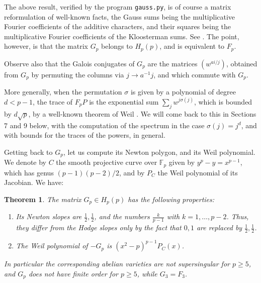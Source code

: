 \documentclass[11pt]{amsart}
\newtheorem{theorem}{Theorem}[section]
\theoremstyle{definition}
\begin{document}
The above result, verified by the program \texttt{gauss.py}, is of course a matrix reformulation of well-known facts, the Gauss sums being the multiplicative Fourier coefficients of the additive characters, and their squares being the multiplicative Fourier coefficients of the Kloosterman sums. See \cite{iro}. The point, however, is that the matrix $G_p$ belongs to $H_p(p)$, and is equivalent to $F_p$.

\medskip

Observe also that the Galois conjugates of $G_p$ are the matrices $(w^{ai/j})$, obtained from $G_p$ by permuting the columns via $j\to a^{-1}j$, and which commute with $G_p$.

\medskip

More generally, when the permutation $\sigma$ is given by a polynomial of degree $d<p-1$, the trace of $F_pP$ is the exponential sum $\sum_jw^{j\sigma(j)}$, which is bounded by $d\sqrt{p}$, by a well-known theorem of Weil \cite{we1}. We will come back to this in Sections 7 and 9 below, with the computation of the spectrum in the case $\sigma(j)=j^d$, and with bounds for the traces of the powers, in general.

\medskip

Getting back to $G_p$, let us compute its Newton polygon, and its Weil polynomial. We denote by $C$ the smooth projective curve over $\mathbb F_p$ given by $y^p-y=x^{p-1}$, which has genus $(p-1)(p-2)/2$, and by $P_C$ the Weil polynomial of its Jacobian. We have:

\begin{theorem}
The matrix $G_p\in H_p(p)$ has the following properties:
\begin{enumerate}
\item Its Newton slopes are $\frac{1}{2},\frac{1}{2}$, and the numbers $\frac{k}{p-1}$ with $k=1,\ldots,p-2$. Thus, they differ from the Hodge slopes only by the fact that $0,1$ are replaced by $\frac{1}{2},\frac{1}{2}$.

\item The Weil polynomial of $-G_p$ is $(x^2-p)^{p-1}P_C(x)$.
\end{enumerate}
In particular the corresponding abelian varieties are not supersingular for $p\geq5$, and $G_p$ does not have finite order for $p\geq5$, while $G_3=F_3$.
\end{theorem}
\end{document}
